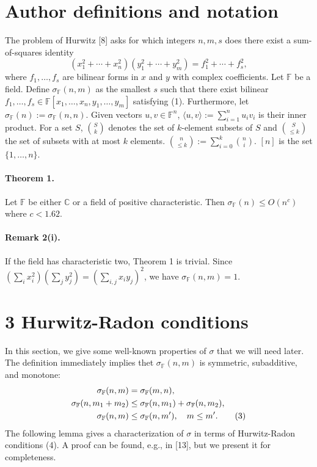 \section*{Author definitions and notation}
The problem of Hurwitz [8] asks for which integers $n,m,s$ does there exist a sum-of-squares identity
\begin{equation}\label{SOS1}
(x_1^2+\cdots+x_n^2)(y_1^2+\cdots+y_m^2)=f_1^2+\cdots+f_s^2,
\end{equation}
where $f_1,\ldots,f_s$ are bilinear forms in $x$ and $y$ with complex coefficients.
Let $\mathbb F$ be a field. Define $\sigma_{\mathbb F}(n,m)$ as the smallest $s$ such that there exist bilinear $f_1,\ldots,f_s\in\mathbb F[x_1,\ldots,x_n,y_1,\ldots,y_m]$ satisfying (1). Furthermore, let $\sigma_{\mathbb F}(n):=\sigma_{\mathbb F}(n,n)$.
Given vectors $u,v\in\mathbb F^n$, $\langle u,v\rangle:=\sum_{i=1}^n u_iv_i$ is their inner product. For a set $S$, $\binom Sk$ denotes the set of $k$-element subsets of $S$ and $\binom S{\le k}$ the set of subsets with at most $k$ elements. $\binom n{\le k}:=\sum_{i=0}^k\binom ni$. $[n]$ is the set $\{1,\ldots,n\}$.
\paragraph{Theorem 1.} Let $\mathbb F$ be either $\mathbb C$ or a field of positive characteristic. Then $\sigma_{\mathbb F}(n)\le O(n^c)$ where $c<1.62$.
\paragraph{Remark 2(i).} If the field has characteristic two, Theorem 1 is trivial. Since $(\sum_i x_i^2)(\sum_j y_j^2)=(\sum_{i,j}x_i y_j)^2$, we have $\sigma_{\mathbb F}(n,m)=1$.
\section*{3 Hurwitz-Radon conditions}
In this section, we give some well-known properties of $\sigma$ that we will need later.
The definition immediately implies thet $\sigma_{\mathbb F}(n,m)$ is symmetric, subadditive, and monotone:
\begin{align}
\sigma_{\mathbb F}(n,m)&=\sigma_{\mathbb F}(m,n),\notag\\
\sigma_{\mathbb F}(n,m_1+m_2)&\le\sigma_{\mathbb F}(n,m_1)+\sigma_{\mathbb F}(n,m_2),\notag\\
\sigma_{\mathbb F}(n,m)&\le\sigma_{\mathbb F}(n,m'),\quad m\le m'.\tag{3}
\end{align}
The following lemma gives a characterization of $\sigma$ in terms of Hurwitz-Radon conditions (4). A proof can be found, e.g., in [13], but we present it for completeness.
